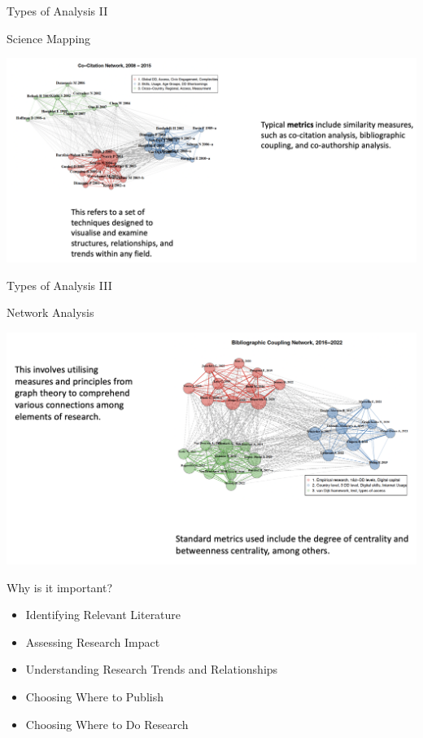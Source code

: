 \documentclass[
  ignorenonframetext,
]{beamer}
\providecommand{\tightlist}{%
  \setlength{\itemsep}{0pt}\setlength{\parskip}{0pt}}
\begin{document}
\begin{frame}{Types of Analysis II}
\protect\hypertarget{types-of-analysis-ii}{}
\begin{block}{Science Mapping}
\protect\hypertarget{science-mapping}{}
\begin{center}
\includegraphics[width=1\textwidth]{pic_2.png}
\end{center}
\end{block}
\end{frame}

\begin{frame}{Types of Analysis III}
\protect\hypertarget{types-of-analysis-iii}{}
\begin{block}{Network Analysis}
\protect\hypertarget{network-analysis}{}
\begin{center}
\includegraphics[width=1\textwidth]{pic_3.png}
\end{center}
\end{block}
\end{frame}

\begin{frame}{Why is it important?}
\protect\hypertarget{why-is-it-important}{}
\begin{itemize}
\tightlist
\item
  Identifying Relevant Literature
\item
  Assessing Research Impact
\item
  Understanding Research Trends and Relationships
\item
  Choosing Where to Publish
\item
  Choosing Where to Do Research
\end{itemize}
\end{frame}
\end{document}
